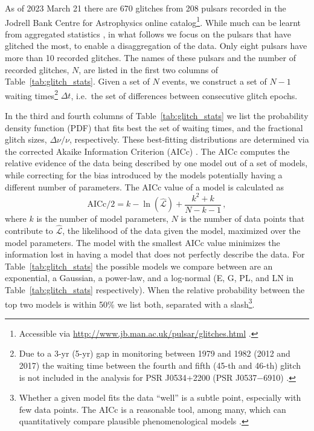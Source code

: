 As of 2023 March 21 there are 670 glitches from 208 pulsars recorded in the Jodrell Bank Centre for Astrophysics online catalog\footnote{Accessible via \url{http://www.jb.man.ac.uk/pulsar/glitches.html} \citep{Espinoza2011,Basu2022}.}. While much can be learnt from aggregated statistics \citep{Lyne2000a,Espinoza2011,Yu2013,Fuentes2017,Ashton2017,Eya2019,Basu2022}, in what follows we focus on the pulsars that have glitched the most, to enable a disaggregation of the data. Only eight pulsars have more than 10 recorded glitches. The names of these pulsars and the number of recorded glitches, $N$, are listed in the first two columns of Table~\ref{tab:glitch_stats}. Given a set of $N$ events, we construct a set of $N-1$ waiting times\footnote{Due to a 3-yr (5-yr) gap in monitoring between 1979 and 1982 (2012 and 2017) the waiting time between the fourth and fifth (45-th and 46-th) glitch is not included in the analysis for PSR J0534+2200 (PSR J0537$-$6910) \citep{Espinoza2014,Ho2020}.} $\Delta t$, i.e.~the set of differences between consecutive glitch epochs. 

In the third and fourth columns of Table~\ref{tab:glitch_stats} we list the probability density function (PDF) that fits best the set of waiting times, and the fractional glitch sizes, $\Delta \nu / \nu$, respectively. These best-fitting distributions are determined via the corrected Akaike Information Criterion (AICc) \citep{Akaike1974,Hurvich1989}. The AICc computes the relative evidence of the data being described by one model out of a set of models, while correcting for the bias introduced by the models potentially having a different number of parameters. The AICc value of a model is calculated as
\begin{equation}
   \textrm{AICc} / 2 = k - \ln\left(\hat{\mathcal{L}}\right) + \frac{k^2 + k}{N - k - 1}\,,
\end{equation}
where $k$ is the number of model parameters, $N$ is the number of data points that contribute to $\hat{\mathcal{L}}$, the likelihood of the data given the model, maximized over the model parameters. The model with the smallest AICc value minimizes the information lost in having a model that does not perfectly describe the data. For Table~\ref{tab:glitch_stats} the possible models we compare between are an exponential, a Gaussian, a power-law, and a log-normal (E, G, PL, and LN in Table~\ref{tab:glitch_stats} respectively). When the relative probability between the top two models is within 50\% we list both, separated with a slash\footnote{Whether a given model fits the data ``well'' is a subtle point, especially with few data points. The AICc is a reasonable tool, among many, which can quantitatively compare plausible phenomenological models \citep{Gelman2013}.}. 

